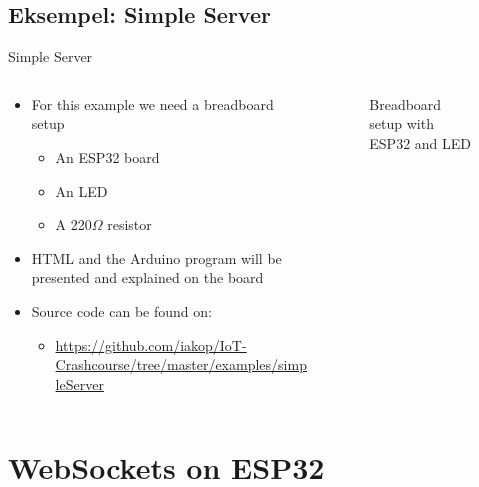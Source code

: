 \documentclass[aspectratio=169]{beamer}
\begin{document}
\subsection{Eksempel: Simple Server}
\begin{frame}{Simple Server}
\begin{columns}
	\begin{column}{0.6\textwidth}
		\begin{textBox}
		\begin{itemize}
			\item For this example we need a breadboard setup
			\begin{itemize}
				\item An ESP32 board
				\item An LED
				\item A 220{\textsf{$\Omega$}} resistor
			\end{itemize}
			\item HTML and the Arduino program will be presented and explained on the board
			\item Source code can be found on:
			\begin{itemize}
				\item \tiny\url{https://github.com/iakop/IoT-Crashcourse/tree/master/examples/simpleServer}
			\end{itemize}
		\end{itemize}
		\end{textBox}
	\end{column}
	\begin{column}{0.4\textwidth}
		\centering
		\begin{figure}
  			
  			\caption{Breadboard setup with ESP32 and LED}
  			\label{fig:esp32-led}
		\end{figure}
	\end{column}
\end{columns}
\end{frame}

\section{WebSockets on ESP32}
\begin{frame}
\end{frame}
\end{document}
